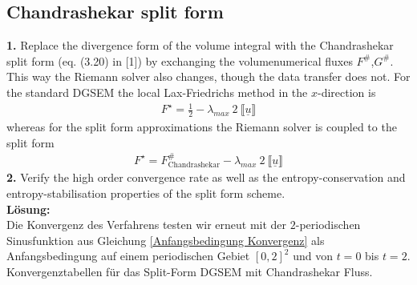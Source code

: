 \documentclass[11pt]{scrartcl}
\begin{document}
\subsection{Chandrashekar split form}
\textbf{1.} Replace the divergence form of the volume integral with the Chandrashekar split form (eq.  (3.20) in [1]) by exchanging the volumenumerical fluxes $F^\#$,$G^\#$. This way the Riemann solver also changes, though the data transfer does not. For the standard DGSEM the local Lax-Friedrichs method in the $x$-direction is 
\begin{align}
F^{\star} =\frac{1}{2}- \lambda_{max} \ 2 \ \llbracket \underline{u} \rrbracket
\end{align}
whereas for the split form approximations the Riemann solver is coupled to the split form
\begin{align}
\label{riemannsplit}
 F^{\star} = F^\#_{\text{Chandrashekar}} - \lambda_{max} \ 2 \ \llbracket \underline{u} \rrbracket
\end{align}
\textbf{2.} Verify the high order convergence rate as well as the entropy-conservation and entropy-stabilisation properties of the split form scheme. \\
\newline
\textbf{Lösung:} \\
Die Konvergenz des Verfahrens testen wir erneut mit der $2$-periodischen Sinusfunktion aus Gleichung \ref{Anfangsbedingung Konvergenz} als Anfangsbedingung auf einem periodischen Gebiet $[0, 2]^2$ und von $t=0$ bis $t=2$.\\

Konvergenztabellen für das Split-Form DGSEM mit Chandrashekar Fluss.
\end{document}
